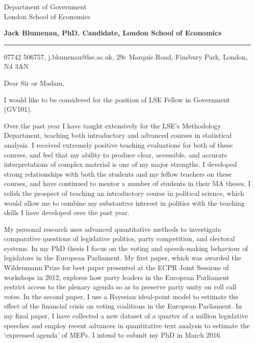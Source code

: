 \documentclass{letter} %
\begin{document}
\signature{Jack Blumenau}           %
\longindentation=0pt                       %
\let\raggedleft\raggedright                %
 
 
\begin{letter}{Department of Government \\
London School of Economics}


\begin{flushleft}
{\large\bf Jack Blumenau, PhD. Candidate, London School of Economics}
\end{flushleft}
\medskip\hrule height 1pt
\begin{flushright}
\hfill 07742 506757, j.blumenau@lse.ac.uk, 29c Marquis Road, Finsbury Park, London, N4 3AN 
\end{flushright} 
\vfill %

 
\opening{Dear Sir or Madam,} 
 
\noindent I would like to be considered for the position of LSE Fellow in Government (GV101).
 
\noindent Over the past year I have taught extensively for the LSE's Methodology Department, teaching both introductory and advanced courses in statistical analysis. I received extremely positive teaching evaluations for both of these courses, and feel that my ability to produce clear, accessible, and accurate interpretations of complex material is one of my major strengths. I developed strong relationships with both the students and my fellow teachers on these courses, and have continued to mentor a number of students in their MA theses. I relish the prospect of teaching an introductory course in political science, which would allow me to combine my substantive interest in politics with the teaching skills I have developed over the past year.

\noindent My personal research uses advanced quantitative methods to investigate comparative questions of legislative politics, party competition, and electoral systems. In my PhD thesis I focus on the voting and speech-making behaviour of legislators in the European Parliament. My first paper, which was awarded the Wildenmann Prize for best paper presented at the ECPR Joint Sessions of workshops in 2012, explores how party leaders in the European Parliament restrict access to the plenary agenda so as to preserve party unity on roll call votes. In the second paper, I use a Bayesian ideal-point model to estimate the effect of the financial crisis on voting coalitions in the European Parliament. In my final paper, I have collected a new dataset of a quarter of a million legislative speeches and employ recent advances in quantitative text analysis to estimate the `expressed agenda' of MEPs. I intend to submit my PhD in March 2016.


\end{letter}
\end{document}
